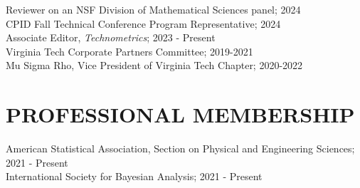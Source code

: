\documentclass[margin,line,11pt]{res}
\begin{document}
\begin{resume}
Reviewer on an NSF Division of Mathematical Sciences panel; 2024 \\
CPID Fall Technical Conference Program Representative; 2024 \\
Associate Editor, {\it Technometrics}; 2023 - Present \\
Virginia Tech Corporate Partners Committee; 2019-2021 \\
Mu Sigma Rho, Vice President of Virginia Tech Chapter; 2020-2022

\medskip
\section{\bf PROFESSIONAL MEMBERSHIP}

American Statistical Association, Section on Physical and Engineering Sciences; 2021 - Present \\
International Society for Bayesian Analysis; 2021 - Present \\

\end{resume}
\end{document}
